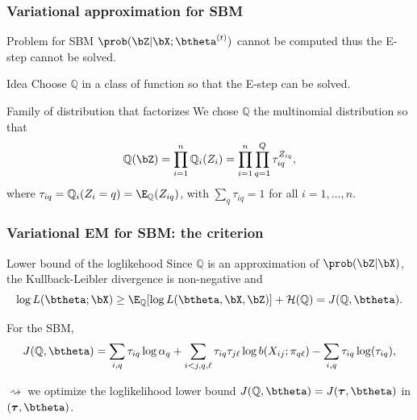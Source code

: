 \documentclass{beamer}\usepackage[]{graphicx}\usepackage[]{color}
\begin{document}
\begin{frame}
  \frametitle{Variational approximation for SBM}

    \begin{block}{Problem for SBM}
      $\prob(\bZ|\bX;\btheta^{(t)})$ cannot be computed thus the E-step cannot be solved.
  \end{block}

  \begin{block}{Idea}
      Choose $\mathbb{Q}$ in a class of function so that the E-step can be solved.
  \end{block}

  \begin{block}{Family of distribution that factorizes}
      We chose $\mathbb{Q}$ the multinomial distribution so that
      \begin{equation*}
        \mathbb{Q}(\bZ) = \prod_{i=1}^n \mathbb{Q}_i(Z_i) = \prod_{i=1}^n\prod_{q=1}^Q \tau_{iq}^{Z_{iq}},
      \end{equation*}
      where $\tau_{iq} =\mathbb{Q}_i(Z_{i} = q) = \E_{\mathbb{Q}}(Z_{iq})$, with $\sum_{q} \tau_{iq} = 1$ for all $i=1,\dots,n$.
  \end{block}

\end{frame}

\begin{frame}
  \frametitle{Variational EM for SBM: the criterion}

  \begin{block}{Lower bound of the loglikehood}
  Since $\mathbb{Q}$ is an approximation of $\prob(\bZ|\bX)$, the Kullback-Leibler divergence is non-negative and
    \begin{equation*}
      \log L(\btheta; \bX) \geq \E_{\mathbb{Q}} [\log L(\btheta, \bX,\bZ)] + \mathcal{H}(\mathbb{Q}) = J(\mathbb{Q},\btheta).
    \end{equation*}
  \end{block}

  For the SBM,
  \begin{equation*}
  J(\mathbb{Q},\btheta) = \sum_{i,q} \tau_{iq} \log \alpha_q + \sum_{i<j,q,\ell}  \tau_{iq}  \tau_{j\ell} \log b(X_{ij} ; \pi_{q\ell}) - \sum_{i,q} \tau_{iq} \log(\tau_{iq}),
  \end{equation*}

  $\rightsquigarrow$ we optimize the loglikelihood lower bound $J(\mathbb{Q},\btheta) = J(\boldsymbol\tau,\btheta)$ in $(\boldsymbol\tau, \btheta)$.

\end{frame}
\end{document}

